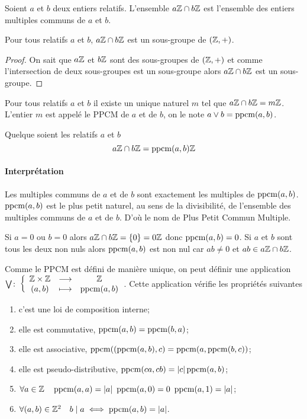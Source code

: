 Soient $a$ et $b$ deux entiers relatifs. L'ensemble $a\mathbb{Z} \cap b\mathbb{Z}$ est l'ensemble des entiers multiples communs de $a$ et $b$.
\begin{theo}
  Pour tous relatifs $a$ et $b$, $a\mathbb{Z} \cap b\mathbb{Z}$ est un sous-groupe de $(\mathbb{Z},+)$.
\end{theo}
\begin{proof}
  On sait que $a\mathbb{Z}$ et $b\mathbb{Z}$ sont des sous-groupes de $(\mathbb{Z},+)$ et comme l'intersection de deux sous-groupes est un sous-groupe alors $a\mathbb{Z} \cap b\mathbb{Z}$ est un sous-groupe.
\end{proof}
\begin{corth}
  Pour tous relatifs $a$ et $b$ il existe un unique naturel $m$ tel que $a\mathbb{Z} \cap b\mathbb{Z}= m \mathbb{Z}$. L'entier $m$ est appelé le PPCM de $a$ et de $b$, on le note $a \vee b = \operatorname{ppcm}(a,b)$.
\end{corth}
\begin{theo}
  Quelque soient les relatifs $a$ et $b$
  \begin{equation}
    a\mathbb{Z} \cap b\mathbb{Z} = \operatorname{ppcm}(a,b) \mathbb{Z}
  \end{equation}
\end{theo}

\paragraph{Interprétation}

Les multiples communs de $a$ et de $b$ sont exactement les multiples de $\operatorname{ppcm}(a,b)$. $\operatorname{ppcm}(a,b)$ est le plus petit naturel, au sens de la divisibilité, de l'ensemble des multiples communs de $a$ et de $b$. D'où le nom de Plus Petit Commun Multiple.

Si $a=0$ ou $b=0$ alors $a\mathbb{Z} \cap b\mathbb{Z} = \{0\}=0\mathbb{Z}$ donc $\operatorname{ppcm}(a,b)=0$. Si $a$ et $b$ sont tous les deux non nuls alors $\operatorname{ppcm}(a,b)$ est non nul car $ab \neq 0$ et $ab \in a\mathbb{Z} \cap b\mathbb{Z}$.

\begin{prop}
  Comme le PPCM est défini de manière unique, on peut définir une application $\bigvee\colon \left\{\begin{array}{ccc} \mathbb{Z}\times\mathbb{Z} & \longrightarrow &\mathbb{Z}\\ (a,b) & \longmapsto & \operatorname{ppcm}(a,b) \end{array} \right.$. Cette application vérifie les propriétés suivantes
  \begin{enumerate}
  \item c'est une loi de composition interne;
  \item elle est commutative, $\operatorname{ppcm}(a,b)=\operatorname{ppcm}(b,a)$;
  \item elle est associative, $\operatorname{ppcm}((\operatorname{ppcm}(a,b),c)=\operatorname{ppcm}(a,\operatorname{ppcm}(b,c))$;
  \item elle est pseudo-distributive, $\operatorname{ppcm}(ca,cb)=\left\lvert c\right\rvert\operatorname{ppcm}(a,b)$;
  \item $\forall a \in \Z \quad \ppcm(a,a)=\abs{a} \ \ppcm(a,0) = 0 \ \ppcm(a,1)=\abs{a}$;
  \item $\forall (a,b) \in \mathbb{Z}^2 \quad b\mid a \iff \operatorname{ppcm}(a,b)=\left\lvert a\right\rvert$.
  \end{enumerate}
\end{prop}


